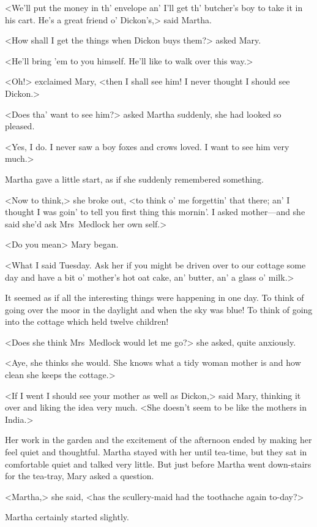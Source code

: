 <We'll put the money in th' envelope an' I'll get th' butcher's boy to take it in his cart. He's a great friend o' Dickon's,> said Martha.

<How shall I get the things when Dickon buys them?> asked Mary.

<He'll bring 'em to you himself. He'll like to walk over this way.>

<Oh!> exclaimed Mary, <then I shall see him! I never thought I should see Dickon.>

<Does tha' want to see him?> asked Martha suddenly, she had looked so pleased.

<Yes, I do. I never saw a boy foxes and crows loved. I want to see him very much.>

Martha gave a little start, as if she suddenly remembered something.

<Now to think,> she broke out, <to think o' me forgettin' that there; an' I thought I was goin' to tell you first thing this mornin'. I asked mother—and she said she'd ask Mrs~Medlock her own self.>

<Do you mean\longdash> Mary began.

<What I said Tuesday. Ask her if you might be driven over to our cottage some day and have a bit o' mother's hot oat cake, an' butter, an' a glass o' milk.>

It seemed as if all the interesting things were happening in one day. To think of going over the moor in the daylight and when the sky was blue! To think of going into the cottage which held twelve children!

<Does she think Mrs~Medlock would let me go?> she asked, quite anxiously.

<Aye, she thinks she would. She knows what a tidy woman mother is and how clean she keeps the cottage.>

<If I went I should see your mother as well as Dickon,> said Mary, thinking it over and liking the idea very much. <She doesn't seem to be like the mothers in India.>

Her work in the garden and the excitement of the afternoon ended by making her feel quiet and thoughtful. Martha stayed with her until tea-time, but they sat in comfortable quiet and talked very little. But just before Martha went down-stairs for the tea-tray, Mary asked a question.

<Martha,> she said, <has the scullery-maid had the toothache again to-day?>

Martha certainly started slightly.

